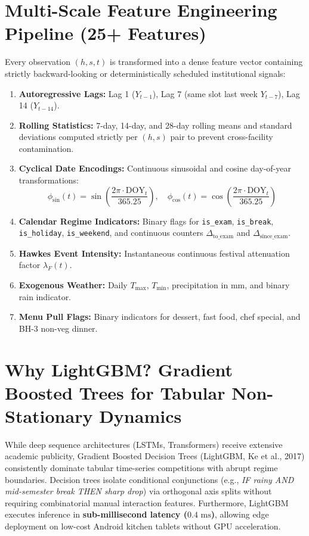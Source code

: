 \documentclass[11pt,a4paper,oneside]{report}
\begin{document}
\section{Multi-Scale Feature Engineering Pipeline (25+ Features)}
Every observation $(h, s, t)$ is transformed into a dense feature vector containing strictly backward-looking or deterministically scheduled institutional signals:
\begin{enumerate}
  \item \textbf{Autoregressive Lags:} Lag 1 ($Y_{t-1}$), Lag 7 (same slot last week $Y_{t-7}$), Lag 14 ($Y_{t-14}$).
  \item \textbf{Rolling Statistics:} 7-day, 14-day, and 28-day rolling means and standard deviations computed strictly per $(h, s)$ pair to prevent cross-facility contamination.
  \item \textbf{Cyclical Date Encodings:} Continuous sinusoidal and cosine day-of-year transformations:
  $$\phi_{\sin}(t) = \sin\left(\frac{2\pi \cdot \text{DOY}_t}{365.25}\right), \quad \phi_{\cos}(t) = \cos\left(\frac{2\pi \cdot \text{DOY}_t}{365.25}\right)$$
  \item \textbf{Calendar Regime Indicators:} Binary flags for \texttt{is\_exam}, \texttt{is\_break}, \texttt{is\_holiday}, \texttt{is\_weekend}, and continuous counters $\Delta_{\text{to\_exam}}$ and $\Delta_{\text{since\_exam}}$.
  \item \textbf{Hawkes Event Intensity:} Instantaneous continuous festival attenuation factor $\lambda_F(t)$.
  \item \textbf{Exogenous Weather:} Daily $T_{\text{max}}$, $T_{\text{min}}$, precipitation in mm, and binary rain indicator.
  \item \textbf{Menu Pull Flags:} Binary indicators for dessert, fast food, chef special, and BH-3 non-veg dinner.
\end{enumerate}

\section{Why LightGBM? Gradient Boosted Trees for Tabular Non-Stationary Dynamics}
While deep sequence architectures (LSTMs, Transformers) receive extensive academic publicity, Gradient Boosted Decision Trees (LightGBM, Ke et al., 2017) consistently dominate tabular time-series competitions with abrupt regime boundaries. Decision trees isolate conditional conjunctions (e.g., \textit{IF rainy AND mid-semester break THEN sharp drop}) via orthogonal axis splits without requiring combinatorial manual interaction features. Furthermore, LightGBM executes inference in \textbf{sub-millisecond latency ($0.4\text{ ms}$)}, allowing edge deployment on low-cost Android kitchen tablets without GPU acceleration.
\end{document}
